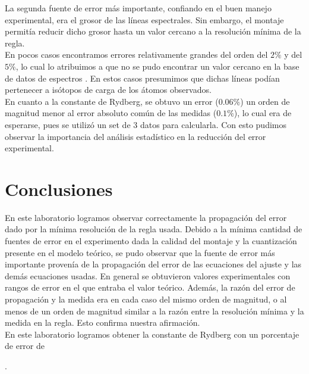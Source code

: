 \documentclass[%
 reprint,
 amsmath,amssymb,
 aps,
]{revtex4-1}
\begin{document}
La segunda fuente de error más importante, confiando en el buen manejo experimental, era el grosor de las líneas espectrales. Sin embargo, el montaje permitía reducir dicho grosor hasta un valor cercano a la resolución mínima de la regla.\\

En pocos casos encontramos errores relativamente grandes del orden del $2\%$ y del $5\%$, lo cual lo atribuimos a que no se pudo encontrar un valor cercano en la base de datos de espectros \cite{base}. En estos casos presumimos que dichas líneas podían pertenecer a isótopos de carga de los átomos observados.\\

En cuanto a la constante de Rydberg, se obtuvo un error ($0.06\%$) un orden de magnitud menor al error absoluto común de las medidas ($0.1\%$), lo cual era de esperarse, pues se utilizó un set de 3 datos para calcularla. Con esto pudimos observar la importancia del análisis estadístico en la reducción del error experimental.\\




\section{\label{sec:level1}Conclusiones}
En este laboratorio logramos observar correctamente la propagación del error dado por la mínima resolución de la regla usada. Debido a la mínima cantidad de fuentes de error en el experimento dada la calidad del montaje y la cuantización presente en el modelo teórico, se pudo observar que la fuente de error más importante provenía de la propagación del error de las ecuaciones del ajuste y las demás ecuaciones usadas. En general se obtuvieron valores experimentales con rangos de error en el que entraba el valor teórico. Además, la razón del error de propagación y la medida era en cada caso del mismo orden de magnitud, o al menos de un orden de magnitud similar a la razón entre la resolución mínima y la medida en la regla. Esto confirma nuestra afirmación.\\

 En este laboratorio logramos obtener la constante de Rydberg con un porcentaje de error de


\begin{thebibliography}{99} 
.\\ 
\\ \end{thebibliography}
\end{document}
